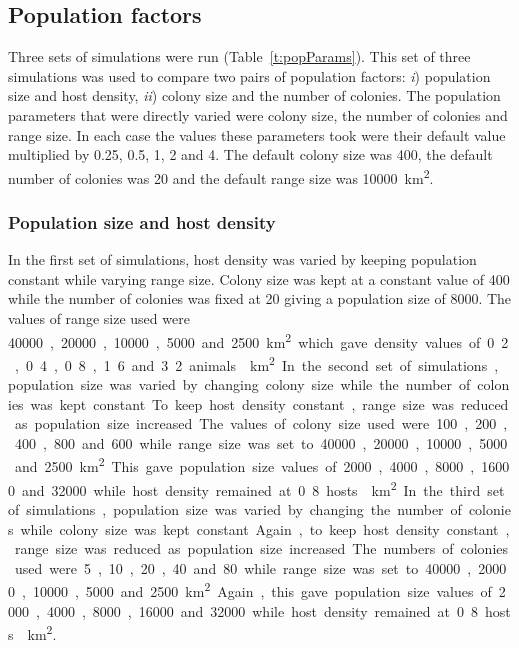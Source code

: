 \subsection{Population factors}

Three sets of simulations were run (Table~\ref{t:popParams}).
This set of three simulations was used to compare two pairs of population factors: \emph{i}) population size and host density, \emph{ii}) colony size and the number of colonies.
The population parameters that were directly varied were colony size, the number of colonies and range size.
In each case the values these parameters took were their default value multiplied by 0.25, 0.5, 1, 2 and 4.
The default colony size was 400, the default number of colonies was 20 and the default range size was \SI{10000}{{\square\kilo\metre}}.

\subsubsection{Population size and host density}
In the first set of simulations, host density was varied by keeping population constant while varying range size.
Colony size was kept at a constant value of 400 while the number of colonies was fixed at 20 giving a population size of 8000.
The values of range size used were \SI{40000}, \SI{20000}, \SI{10000}, \SI{5000} and \SI{2500}{\square\kilo\metre} which gave density values of 0.2, 0.4, 0.8, 1.6 and 3.2 animals.\si{\per\square\kilo\metre}.

In the second set of simulations, population size was varied by changing colony size while the number of colonies was kept constant.
To keep host density constant, range size was reduced as population size increased.
The values of colony size used were 100, 200, 400, 800 and \SI{600} while range size was set to \SI{40000}, \SI{20000}, \SI{10000}, \SI{5000} and \SI{2500}{\square\kilo\metre}.
This gave population size values of \SI{2000}, \SI{4000}, \SI{8000}, \SI{16000} and \SI{32000} while host density remained at 0.8 hosts{\si{\per\square\kilo\metre}}.

In the third set of simulations, population size was varied by changing the number of colonies while colony size was kept constant.
Again, to keep host density constant, range size was reduced as population size increased.
The numbers of colonies used were 5, 10, 20, 40 and 80 while range size was set to \SI{40000}, \SI{20000}, \SI{10000}, \SI{5000} and \SI{2500}{\square\kilo\metre}.
Again, this gave population size values of \SI{2000}, \SI{4000}, \SI{8000}, \SI{16000} and \SI{32000} while host density remained at 0.8 hosts{\si{\per\square\kilo\metre}}.


